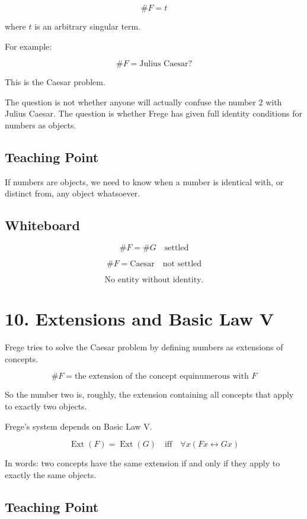 \documentclass[11pt]{article}
\begin{document}
\[
\#F = t
\]

where \(t\) is an arbitrary singular term.

For example:

\[
\#F = \text{Julius Caesar?}
\]

This is the Caesar problem.

The question is not whether anyone will actually confuse the number \(2\) with Julius
Caesar. The question is whether Frege has given full identity conditions for numbers as
objects.

\subsection*{Teaching Point}

If numbers are objects, we need to know when a number is identical with, or distinct from,
any object whatsoever.

\subsection*{Whiteboard}

\[
\#F = \#G
\quad
\text{settled}
\]

\[
\#F = \text{Caesar}
\quad
\text{not settled}
\]

\[
\text{No entity without identity.}
\]

\section*{10. Extensions and Basic Law V}

Frege tries to solve the Caesar problem by defining numbers as extensions of concepts.

\[
\#F =
\text{the extension of the concept equinumerous with }F
\]

So the number two is, roughly, the extension containing all concepts that apply to exactly
two objects.

Frege's system depends on Basic Law V.

\[
\boxed{
\operatorname{Ext}(F)=\operatorname{Ext}(G)
\quad \text{iff}
\quad
\forall x(Fx \leftrightarrow Gx)
}
\]

In words: two concepts have the same extension if and only if they apply to exactly the
same objects.

\subsection*{Teaching Point}
\end{document}
